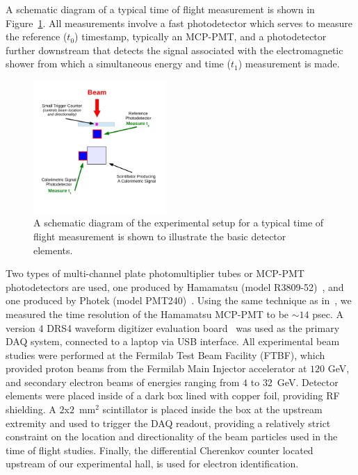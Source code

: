 \documentclass[12pt]{article}
\begin{document}
A schematic diagram of a typical time of flight measurement
is shown in Figure~\ref{fig:TypicalSchematicDiagram}. All
measurements involve a fast photodetector which serves to
measure the reference ($t_{0}$) timestamp, typically 
an MCP-PMT, and a photodetector further downstream
that detects the signal associated with the
electromagnetic shower from which a simultaneous energy 
and time ($t_{1}$) measurement is made. 

\begin{figure}[H] \centering
\includegraphics[width=0.45\textwidth]{figs/TypicalSchematicDiagram} 
\caption{A schematic diagram of the experimental setup for
a typical time of flight measurement is shown to illustrate the
basic detector elements.} 
\label{fig:TypicalSchematicDiagram}
\end{figure}

Two types of multi-channel plate photomultiplier
tubes or MCP-PMT photodetectors 
are used, one produced by Hamamatsu 
(model R3809-52)~\cite{HamamatsuMCP3809}, and one
produced by Photek (model PMT240)~\cite{Photek240}. Using the same technique as in~\cite{MCPFastCaloNIMA}, we measured the time resolution of the Hamamatsu MCP-PMT to be $\sim 14$ psec. 
A version 4 DRS4 waveform digitizer evaluation board~\cite{DRS4} was
used as the primary DAQ system, connected to a laptop via
USB interface. All experimental beam studies were performed
at the Fermilab Test Beam Facility (FTBF), which 
provided proton beams from the Fermilab Main Injector accelerator
at $120$ GeV, and secondary electron beams of energies ranging 
from $4$ to $32$~GeV. Detector elements were placed inside of a 
dark box lined with copper foil, providing RF shielding. A
$2$x$2$~$\mathrm{mm}^{2}$ scintillator is placed inside the box at
the upstream extremity and used to trigger the DAQ readout,
providing a relatively strict constraint on the location and directionality
of the beam particles used in the time of flight studies. 
Finally, the differential Cherenkov counter located upstream
of our experimental hall, is used for electron identification. 
\end{document}
